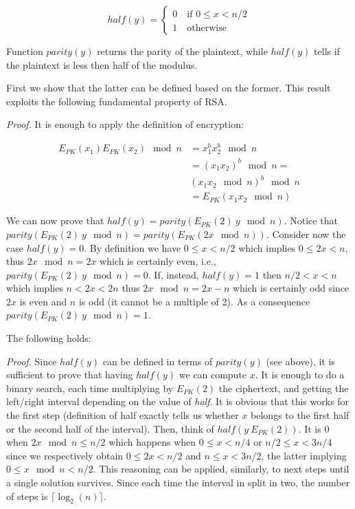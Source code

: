 $$
\mathit{half}(y) = \begin{cases}
    0 \quad \text{if $0 \leq x < n/2$} \\
    1 \quad \text{otherwise}
\end{cases}
$$

Function $\mathit{parity}(y)$ returns the parity of the plaintext, while $\mathit{half}(y)$ tells if the plaintext is less then half of the modulus. 

First we show that the latter can be defined based on the former. This result exploits the following fundamental property of RSA.


\textit{Proof.} It is enough to apply the definition of encryption:

$$\begin{array}{ll}E_{PK}(x_1)E_{PK}(x_2) \mod n & = x_1^bx_2^b \mod n \\&= (x_1x_2)^b \mod n =\\& (x_1x_2 \mod n)^b \mod n \\&= E_{PK}(x_1x_2 \mod n)\end{array}$$

We can now prove that $\mathit{half}(y) = \mathit{parity}( E_{PK}(2) \ y \mod n)$. Notice that $\mathit{parity}(E_{PK}(2) \ y \mod n) = \mathit{parity}(E_{PK}(2x \mod n))$. Consider now the case $\mathit{half}(y) = 0$. By definition we have $0\leq x<n/2$ which implies $0 \leq 2x < n$, thus $2x \mod n = 2x$ which is certainly even, i.e., $\mathit{parity}(E_{PK}(2) \ y\mod n) = 0$. If, instead, $\mathit{half}(y) = 1$ then $n/2<x<n$ which implies $n <  2x < 2n$ thus $2x \mod n = 2x - n$ which is certainly odd since $2x$ is even and $n$ is odd (it cannot be a multiple of 2). As a consequence $\mathit{parity}( E_{PK}(2) \ y \mod n) = 1$.

The following holds:


\textit{Proof.} Since $\mathit{half}(y)$ can be defined in terms of $\mathit{parity}(y)$ (see above), it is sufficient to prove that having $\mathit{half}(y)$ we can compute $x$. It is enough to do a binary search, each time multiplying by $E_{PK}(2)$ the ciphertext, and getting the left/right interval depending on the value of \textit{half}. It is obvious that this works for the first step (definition of half exactly tells us whether $x$ belongs to the first half or the second half of the interval). Then, think of $\mathit{half}(y \ E_{PK}(2))$. It is 0 when $2x \mod n \leq n/2$ which happens when $0 \leq x < n/4$ or $n/2 \leq x < 3n/4$ since we respectively obtain $0 \leq 2x < n/2$ and $n \leq x < 3n/2$, the latter implying $0 \leq x \mod n < n/2$. This reasoning can be applied, similarly, to next steps until a single solution survives. Since each time the interval in split in two, the number of steps is $\lceil\log_2(n)\rceil$.

